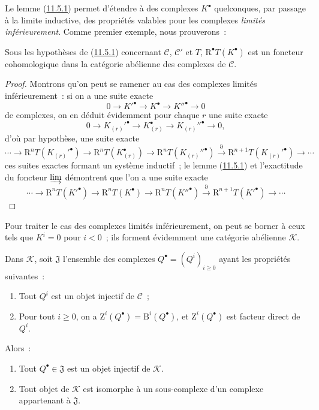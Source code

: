 Le lemme (\hyperref[0.11.5.1-fr]{11.5.1}) permet d'étendre à des complexes
$K^\bullet$ quelconques, par passage à la limite inductive, des propriétés
valables pour les complexes \emph{limités inférieurement}. Comme premier
exemple, nous prouverons~:

\begin{proposition}[11.5.2]
\label{0.11.5.2-fr}
Sous les hypothèses de (\hyperref[0.11.5.1-fr]{11.5.1}) concernant
$\mathcal C$, $\mathcal C'$ et $T$, $\mathrm R^\bullet T(K^\bullet)$ est un
foncteur cohomologique dans la catégorie abélienne des complexes de
$\mathcal C$.
\end{proposition}

\begin{proof}
Montrons qu'on peut se ramener au cas des complexes limités inférieurement~:
si on a une suite exacte
\[
  0\longrightarrow K'^\bullet\longrightarrow K^\bullet
  \longrightarrow K''^\bullet\longrightarrow0
\]
de complexes, on en déduit évidemment pour chaque $r$ une suite exacte
\[
  0\longrightarrow K_{(r)}'^\bullet\longrightarrow K_{(r)}^\bullet
  \longrightarrow K_{(r)}''^\bullet\longrightarrow0,
\]
d'où par hypothèse, une suite exacte
\[
  \cdots\longrightarrow\mathrm R^nT(K_{(r)}'^\bullet)
  \longrightarrow\mathrm R^nT(K_{(r)}^\bullet)
  \longrightarrow\mathrm R^nT(K_{(r)}''^\bullet)
  \xrightarrow{\partial}\mathrm R^{n+1}T(K_{(r)}'^\bullet)
  \longrightarrow\cdots
\]
ces suites exactes formant un système inductif~; le lemme
(\hyperref[0.11.5.1-fr]{11.5.1}) et l'exactitude du foncteur $\varinjlim$
démontrent que l'on a une suite exacte
\[
  \cdots\longrightarrow\mathrm R^nT(K'^\bullet)
  \longrightarrow\mathrm R^nT(K^\bullet)
  \longrightarrow\mathrm R^nT(K''^\bullet)
  \xrightarrow{\partial}\mathrm R^{n+1}T(K'^\bullet)
  \longrightarrow\cdots
\]
\end{proof}

Pour traiter le cas des complexes limités inférieurement, on peut se borner à
ceux tels que $K^i=0$ pour $i<0$~; ils forment évidemment une catégorie
abélienne $\mathcal K$.

\begin{lemma}[11.5.2.1]
\label{0.11.5.2.1-fr}
Dans $\mathcal K$, soit $\mathfrak J$ l'ensemble des complexes
$Q^\bullet=(Q^i)_{i\geq0}$ ayant les
propriétés suivantes~:
\begin{enumerate}
  \item[$1^\circ$] Tout $Q^i$ est un objet injectif de $\mathcal C$~;
  \item[$2^\circ$] Pour tout $i\geq0$, on a
    $\mathrm Z^i(Q^\bullet)=\mathrm B^i(Q^\bullet)$, et
    $\mathrm Z^i(Q^\bullet)$ est facteur direct de $Q^i$.
\end{enumerate}
Alors~:
\begin{enumerate}
  \item[(i)] Tout $Q^\bullet\in\mathfrak J$ est un objet injectif de
    $\mathcal K$.
  \item[(ii)] Tout objet de $\mathcal K$ est isomorphe à un sous-complexe
    d'un complexe appartenant à $\mathfrak J$.
\end{enumerate}
\end{lemma}

